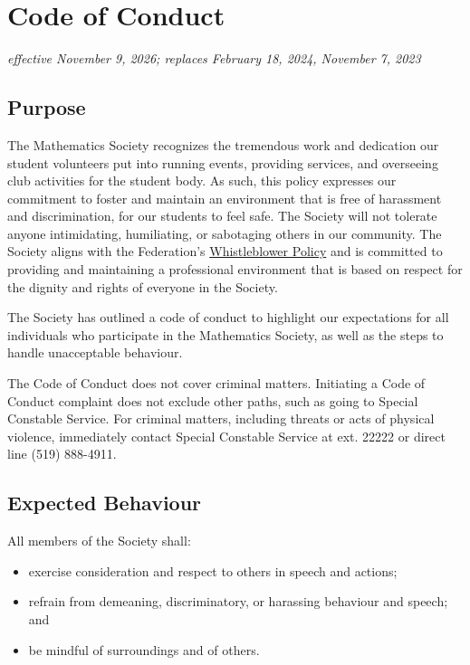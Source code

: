 \section{Code of Conduct}
\emph{effective November 9, 2026; replaces February 18, 2024, November 7, 2023}\\

\subsection{Purpose}
The Mathematics Society recognizes the tremendous work and dedication our student volunteers put into running events, providing services, and overseeing club activities for the student body. As such, this policy expresses our commitment to foster and maintain an environment that is free of harassment and discrimination, for our students to feel safe. The Society will not tolerate anyone intimidating, humiliating, or sabotaging others in our community. The Society aligns with the Federation's \href{https://wusa.ca/document/whistleblower-policy/}{Whistleblower Policy} and is committed to providing and maintaining a professional environment that is based on respect for the dignity and rights of everyone in the Society.

The Society has outlined a code of conduct to highlight our expectations for all individuals who participate in the Mathematics Society, as well as the steps to handle unacceptable behaviour.

The Code of Conduct does not cover criminal matters. Initiating a Code of Conduct complaint does not exclude other paths, such as going to Special Constable Service. For criminal matters, including threats or acts of physical violence, immediately contact Special Constable Service at ext. 22222 or direct line (519) 888-4911.

\subsection{Expected Behaviour}
All members of the Society shall:
\begin{itemize}
	\item exercise consideration and respect to others in speech and actions;
	\item refrain from demeaning, discriminatory, or harassing behaviour and speech; and
	\item be mindful of surroundings and of others.
\end{itemize}


